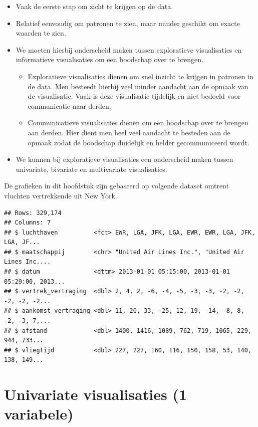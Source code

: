 \documentclass[]{tufte-book}
\providecommand{\tightlist}{%
  \setlength{\itemsep}{0pt}\setlength{\parskip}{0pt}}
\begin{document}
\begin{itemize}
\tightlist
\item
  Vaak de eerste stap om zicht te krijgen op de data.
\item
  Relatief eenvoudig om patronen te zien, maar minder geschikt om exacte waarden te zien.
\item
  We moeten hierbij onderscheid maken tussen exploratieve visualisaties en informatieve visualisaties om een boodschap over te brengen.

  \begin{itemize}
  \tightlist
  \item
    Exploratieve visualisaties dienen om snel inzicht te krijgen in patronen in de data. Men besteedt hierbij veel minder aandacht aan de opmaak van de visualisatie. Vaak is deze visualisatie tijdelijk en niet bedoeld voor communicatie naar derden.
  \item
    Communicatieve visualisaties dienen om een boodschap over te brengen aan derden. Hier dient men heel veel aandacht te besteden aan de opmaak zodat de boodschap duidelijk en helder gecommuniceerd wordt.
  \end{itemize}
\item
  We kunnen bij exploratieve visualisaties een onderscheid maken tussen univariate, bivariate en multivariate visualisaties.
\end{itemize}

De grafieken in dit hoofdstuk zijn gebaseerd op volgende dataset omtrent vluchten vertrekkende uit New York.

\begin{verbatim}
## Rows: 329,174
## Columns: 7
## $ luchthaven          <fct> EWR, LGA, JFK, LGA, EWR, EWR, LGA, JFK, LGA, JF...
## $ maatschappij        <chr> "United Air Lines Inc.", "United Air Lines Inc....
## $ datum               <dttm> 2013-01-01 05:15:00, 2013-01-01 05:29:00, 2013...
## $ vertrek_vertraging  <dbl> 2, 4, 2, -6, -4, -5, -3, -3, -2, -2, -2, -2, -2...
## $ aankomst_vertraging <dbl> 11, 20, 33, -25, 12, 19, -14, -8, 8, -2, -3, 7,...
## $ afstand             <dbl> 1400, 1416, 1089, 762, 719, 1065, 229, 944, 733...
## $ vliegtijd           <dbl> 227, 227, 160, 116, 150, 158, 53, 140, 138, 149...
\end{verbatim}

\hypertarget{univariate-visualisaties-1-variabele}{%
\section{Univariate visualisaties (1 variabele)}\label{univariate-visualisaties-1-variabele}}
\end{document}
